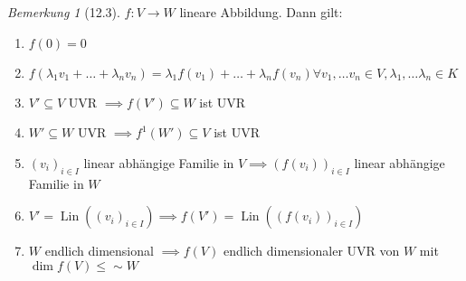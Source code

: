 \documentclass[a4paper]{scrartcl}
\DeclareMathOperator{\Forall}{\forall}
\DeclareMathOperator{\Lin}{Lin}
\theoremstyle{definition}
\theoremstyle{plain}
\theoremstyle{plain}
\theoremstyle{remark}
\newtheorem{remark}{Bemerkung}
\theoremstyle{remark}
\theoremstyle{remark}
\theoremstyle{remark}
\theoremstyle{remark}
\begin{document}
\begin{remark}[12.3]
$f: V\to W$ lineare Abbildung. Dann gilt:
\begin{enumerate}
\item $f(0) = 0$
\item $f(\lambda_1 v_1 + \ldots + \lambda_n v_n) = \lambda_1 f(v_1) + \ldots + \lambda_n f(v_n) \Forall v_1, \ldots v_n \in V, \lambda_1,\ldots\lambda_n \in K$
\item $V'\subseteq V$ UVR $\implies f(V') \subseteq W$ ist UVR
\item $W'\subseteq W$ UVR $\implies f^{1}(W') \subseteq V$ ist UVR
\item $(v_i)_{i\in I}$ linear abhängige Familie in $V \implies (f(v_i))_{i\in I}$ linear abhängige Familie in $W$
\item $V' = \Lin((v_i)_{i\in I}) \implies f(V') = \Lin((f(v_i))_{i\in I})$
\item $W$ endlich dimensional $\implies f(V)$ endlich dimensionaler UVR von $W$ mit $\dim f(V) \leq \sim W$
\end{enumerate}
\end{remark}
\end{document}
